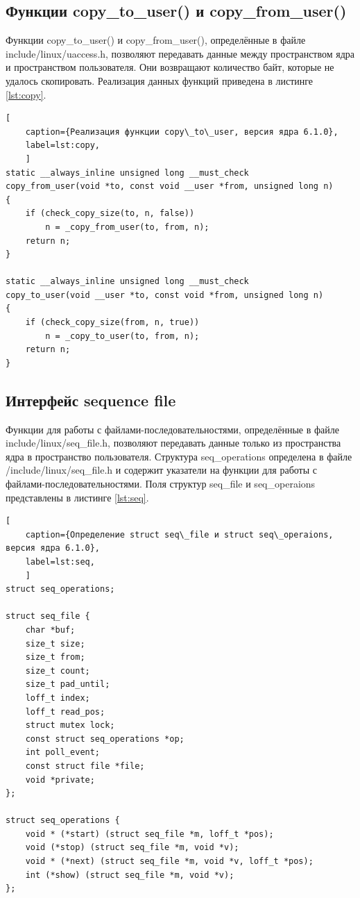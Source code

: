 \subsection{Функции copy\_to\_user() и copy\_from\_user()}

Функции copy\_to\_user() и copy\_from\_user(), определённые в файле include/linux/uaccess.h, позволяют передавать данные между пространством ядра и пространством пользователя. Они возвращают количество байт, которые не удалось скопировать. Реализация данных функций приведена в листинге \ref{lst:copy}.~\cite{copy}

\begin{lstlisting}[
	caption={Реализация функции copy\_to\_user, версия ядра 6.1.0},
	label=lst:copy,
	]
static __always_inline unsigned long __must_check
copy_from_user(void *to, const void __user *from, unsigned long n)
{
	if (check_copy_size(to, n, false))
		n = _copy_from_user(to, from, n);
	return n;
}

static __always_inline unsigned long __must_check
copy_to_user(void __user *to, const void *from, unsigned long n)
{
	if (check_copy_size(from, n, true))
		n = _copy_to_user(to, from, n);
	return n;
}
\end{lstlisting}

\subsection{Интерфейс sequence file}

Функции для работы с файлами-последовательностями, определённые в файле include/linux/seq\_file.h, позволяют передавать данные только из пространства ядра в пространство пользователя. Структура seq\_operations определена в файле /include/linux/seq\_file.h и содержит указатели на функции для работы с файлами-последовательностями. Поля структур seq\_file и seq\_operaions представлены в листинге \ref{lst:seq}. \cite{seq}

\begin{lstlisting}[
	caption={Определение struct seq\_file и struct seq\_operaions, версия ядра 6.1.0},
	label=lst:seq,
	]
struct seq_operations;

struct seq_file {
	char *buf;
	size_t size;
	size_t from;
	size_t count;
	size_t pad_until;
	loff_t index;
	loff_t read_pos;
	struct mutex lock;
	const struct seq_operations *op;
	int poll_event;
	const struct file *file;
	void *private;
};

struct seq_operations {
	void * (*start) (struct seq_file *m, loff_t *pos);
	void (*stop) (struct seq_file *m, void *v);
	void * (*next) (struct seq_file *m, void *v, loff_t *pos);
	int (*show) (struct seq_file *m, void *v);
};
\end{lstlisting}

